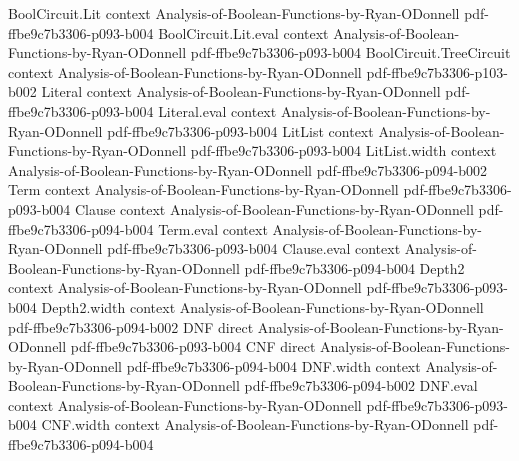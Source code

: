 \begin{lemma}
\label{LMN.bernoulliRestrProb_list_union_bound}
\leanok
{}
\proofstep
  {BoolCircuit.Lit}
  {context}
  {Analysis-of-Boolean-Functions-by-Ryan-ODonnell}
  {pdf-ffbe9c7b3306-p093-b004}
\proofstep
  {BoolCircuit.Lit.eval}
  {context}
  {Analysis-of-Boolean-Functions-by-Ryan-ODonnell}
  {pdf-ffbe9c7b3306-p093-b004}
\proofstep
  {BoolCircuit.TreeCircuit}
  {context}
  {Analysis-of-Boolean-Functions-by-Ryan-ODonnell}
  {pdf-ffbe9c7b3306-p103-b002}
\proofstep
  {Literal}
  {context}
  {Analysis-of-Boolean-Functions-by-Ryan-ODonnell}
  {pdf-ffbe9c7b3306-p093-b004}
\proofstep
  {Literal.eval}
  {context}
  {Analysis-of-Boolean-Functions-by-Ryan-ODonnell}
  {pdf-ffbe9c7b3306-p093-b004}
\proofstep
  {LitList}
  {context}
  {Analysis-of-Boolean-Functions-by-Ryan-ODonnell}
  {pdf-ffbe9c7b3306-p093-b004}
\proofstep
  {LitList.width}
  {context}
  {Analysis-of-Boolean-Functions-by-Ryan-ODonnell}
  {pdf-ffbe9c7b3306-p094-b002}
\proofstep
  {Term}
  {context}
  {Analysis-of-Boolean-Functions-by-Ryan-ODonnell}
  {pdf-ffbe9c7b3306-p093-b004}
\proofstep
  {Clause}
  {context}
  {Analysis-of-Boolean-Functions-by-Ryan-ODonnell}
  {pdf-ffbe9c7b3306-p094-b004}
\proofstep
  {Term.eval}
  {context}
  {Analysis-of-Boolean-Functions-by-Ryan-ODonnell}
  {pdf-ffbe9c7b3306-p093-b004}
\proofstep
  {Clause.eval}
  {context}
  {Analysis-of-Boolean-Functions-by-Ryan-ODonnell}
  {pdf-ffbe9c7b3306-p094-b004}
\proofstep
  {Depth2}
  {context}
  {Analysis-of-Boolean-Functions-by-Ryan-ODonnell}
  {pdf-ffbe9c7b3306-p093-b004}
\proofstep
  {Depth2.width}
  {context}
  {Analysis-of-Boolean-Functions-by-Ryan-ODonnell}
  {pdf-ffbe9c7b3306-p094-b002}
\proofstep
  {DNF}
  {direct}
  {Analysis-of-Boolean-Functions-by-Ryan-ODonnell}
  {pdf-ffbe9c7b3306-p093-b004}
\proofstep
  {CNF}
  {direct}
  {Analysis-of-Boolean-Functions-by-Ryan-ODonnell}
  {pdf-ffbe9c7b3306-p094-b004}
\proofstep
  {DNF.width}
  {context}
  {Analysis-of-Boolean-Functions-by-Ryan-ODonnell}
  {pdf-ffbe9c7b3306-p094-b002}
\proofstep
  {DNF.eval}
  {context}
  {Analysis-of-Boolean-Functions-by-Ryan-ODonnell}
  {pdf-ffbe9c7b3306-p093-b004}
\proofstep
  {CNF.width}
  {context}
  {Analysis-of-Boolean-Functions-by-Ryan-ODonnell}
  {pdf-ffbe9c7b3306-p094-b004}
\proofstep

\end{lemma}
